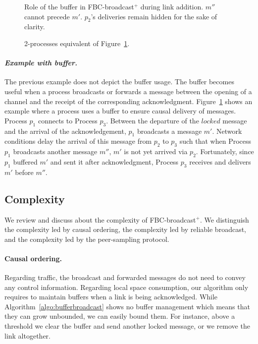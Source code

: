 \begin{figure}
  \begin{center}
    
    \caption{\label{fig:buffer}Role of the buffer in FBC-broadcast$^+$ during
      link addition. $m''$ cannot precede $m'$. $p_2$'s deliveries remain hidden
      for the sake of clarity.}
  \end{center}
\end{figure}

\begin{figure}
  \begin{center}
    
    \caption{\label{fig:eq2buffer}2-processes equivalent of
      Figure~\ref{fig:buffer}.}
  \end{center}
\end{figure}

\paragraph{\emph{Example with buffer.}} The previous example does not depict the
buffer usage. The buffer becomes useful when a process broadcasts or forwards a
message between the opening of a channel and the receipt of the corresponding
acknowledgment. Figure~\ref{fig:buffer} shows an example where a process uses a
buffer to ensure causal delivery of messages. Process $p_1$ connects to Process
$p_3$. Between the departure of the $locked$ message and the arrival of the
acknowledgement, $p_1$ broadcasts a message $m'$. Network conditions
delay the arrival of this message from $p_2$ to $p_3$ such that when Process
$p_1$ broadcasts another message $m''$, $m'$ is not yet arrived via
$p_2$. Fortunately, since $p_1$ buffered $m'$ and sent it after acknowledgment,
Process $p_3$ receives and delivers $m'$ before $m''$.


\subsection{Complexity}
\label{subsec:complexity}

We review and discuss about the complexity of FBC-broadcast$^+$. We distinguish
the complexity led by causal ordering, the complexity led by reliable
broadcast, and the complexity led by the peer-sampling protocol.

\paragraph{Causal ordering.} Regarding traffic, the broadcast and forwarded
messages do not need to convey any control information. Regarding local space
consumption, our algorithm only requires to maintain buffers when a link is
being acknowledged. While Algorithm~\ref{algo:bufferbroadcast} shows no buffer
management which means that they can grow unbounded, we can easily bound
them. For instance, above a threshold we clear the buffer and send another
locked message, or we remove the link altogether.


